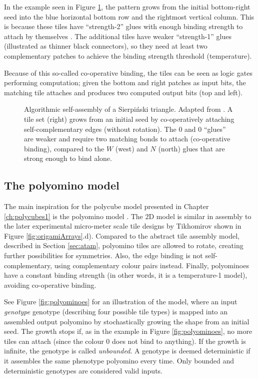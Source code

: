 In the example seen in Figure \ref{fig:atam}, the pattern grows from the initial bottom-right seed into the blue horizontal bottom row and the rightmost vertical column. This is because these tiles have ``strength-2'' glues with enough binding strength to attach by themselves \cite{doty2012theory}. The additional tiles have weaker ``strength-1'' glues (illustrated as thinner black connectors), so they need at least two complementary patches to achieve the binding strength threshold (temperature).

Because of this so-called co-operative binding, the tiles can be seen as logic gates performing computation; given the bottom and right patches as input bits, the matching tile attaches and produces two computed output bits (top and left).



\begin{figure}[h]
  \centering
  \caption{Algorithmic self-assembly of a Sierpiński triangle. Adapted from \cite{doty2017}. A tile set (right) grows from an initial seed by co-operatively attaching self-complementary edges (without rotation). The \(0\) and \(0\) ``glues'' are weaker and require two matching bonds to attach (co-operative binding), compared to the \(W\) (west) and \(N\) (north) glues that are strong enough to bind alone.}
  \label{fig:atam}
\end{figure}

\subsection{The polyomino model}\label{sec:polyomino}

The main inspiration for the polycube model presented in Chapter \ref{ch:polycubes1} is the polyomino model \cite{ahnert2010self, johnston2011evolutionary}. The 2D model is similar in assembly to the later experimental micro-meter scale tile designs by Tikhomirov \cite{tikhomirov2017programmable} shown in Figure \ref{fig:origamiArrays}.d). Compared to the abstract tile assembly model, described in Section \ref{sec:atam}, polyomino tiles are allowed to rotate, creating further possibilities for symmetries. Also, the edge binding is not self-complementary, using complementary colour pairs instead. Finally, polyominoes have a constant binding strength (in other words, it is a temperature-1 model), avoiding co-operative binding. 

See Figure \ref{fig:polyominoes} for an illustration of the model, where an input \emph{genotype} genotype (describing four possible tile types) is mapped into an assembled output polyomino by stochastically growing the shape from an initial seed. The growth stops if, as in the example in Figure \ref{fig:polyominoes}, no more tiles can attach (since the colour \(0\) does not bind to anything). If the growth is infinite, the genotype is called \emph{unbounded}. A genotype is deemed deterministic if it assembles the same phenotype polyomino every time. Only bounded and deterministic genotypes are considered valid inputs.

